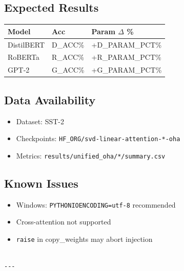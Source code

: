 \subsection{Expected Results}

\begin{table}[H]
\centering
\small
\begin{tabular}{lll}
\toprule
\textbf{Model} & \textbf{Acc} & \textbf{Param $\Delta$ \%} \\
\midrule
DistilBERT & {{D\_ACC}}\% & +{{D\_PARAM\_PCT}}\% \\
RoBERTa & {{R\_ACC}}\% & +{{R\_PARAM\_PCT}}\% \\
GPT-2 & {{G\_ACC}}\% & +{{G\_PARAM\_PCT}}\% \\
\bottomrule
\end{tabular}
\end{table}

\subsection{Data Availability}

\begin{itemize}
\item Dataset: SST-2
\item Checkpoints: \texttt{{{HF\_ORG}}/svd-linear-attention-*-oha}
\item Metrics: \texttt{results/unified\_oha/*/summary.csv}

\end{itemize}
\subsection{Known Issues}

\begin{itemize}
\item Windows: \texttt{PYTHONIOENCODING=utf-8} recommended
\item Cross-attention not supported
\item \texttt{raise} in copy\_weights may abort injection
\end{itemize}
\begin{lstlisting}

---
\end{lstlisting}